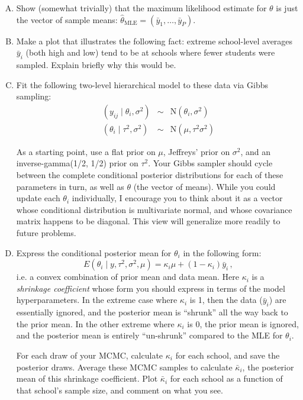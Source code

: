 \documentclass{mynotes}
\begin{document}
\begin{enumerate}[(A)]
\item Show (somewhat trivially) that the maximum likelihood estimate for $\theta$ is just the vector of sample means: $\hat{\theta}_{\mathrm{MLE}} = (\bar{y}_1, \ldots, \bar{y}_P)$.  
\item Make a plot that illustrates the following fact: extreme school-level averages $\bar{y}_i$ (both high and low) tend to be at schools where fewer students were sampled.  Explain briefly why this would be.
\item Fit the following two-level hierarchical model to these data via Gibbs sampling:
\begin{eqnarray*}
(y_{ij} \mid \theta_i, \sigma^2) &\sim& \mbox{N}(\theta_i, \sigma^2) \\
(\theta_i \mid \tau^2, \sigma^2) &\sim& \mbox{N}(\mu, \tau^2 \sigma^2)
\end{eqnarray*}

As a starting point, use a flat prior on $\mu$, Jeffreys' prior on $\sigma^2$, and an inverse-gamma(1/2, 1/2) prior on $\tau^2$.  Your Gibbs sampler should cycle between the complete conditional posterior distributions for each of these parameters in turn, as well as $\theta$ (the vector of means).  While you could update each $\theta_i$ individually, I encourage you to think about it as a vector whose conditional distribution is multivariate normal, and whose covariance matrix happens to be diagonal.  This view will generalize more readily to future problems.  

\item Express the conditional posterior mean for $\theta_i$ in the following form:
$$
E(\theta_i \mid y, \tau^2, \sigma^2, \mu) = \kappa_i \mu + (1-\kappa_i) \bar{y}_i \, ,
$$
i.e. a convex combination of prior mean and data mean.  Here $\kappa_i$ is a \textit{shrinkage coefficient} whose form you should express in terms of the model hyperparameters.  In the extreme case where $\kappa_i$ is 1, then the data ($\bar{y}_i$) are essentially ignored, and the posterior mean is ``shrunk'' all the way back to the prior mean.  In the other extreme where $\kappa_i$ is 0, the prior mean is ignored, and the posterior mean is entirely ``un-shrunk'' compared to the MLE for $\theta_i$.  

For each draw of your MCMC, calculate $\kappa_i$ for each school, and save the posterior draws.  Average these MCMC samples to calculate $\bar{\kappa}_i$, the posterior mean of this shrinkage coefficient.   Plot $\bar{\kappa}_i$ for each school as a function of that school's sample size, and comment on what you see.  


\end{enumerate}
\end{document}
